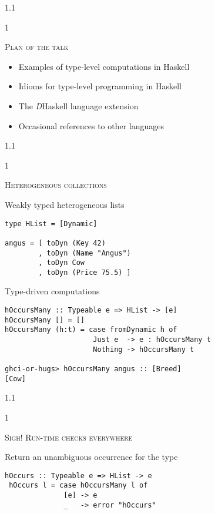 \documentclass{slides}
\newcommand{\header}[1]{{\large\scshape \color{Red} #1} \medskip }
\newcommand{\blau}[1]{{\color{Blue} #1} \medskip }
\newenvironment{myslide}{\begin{slide}\color{Blue}\begin{boxedminipage}{1.1\hsize}\begin{boxedminipage}{1\hsize}\color{Black}
\vspace{-170\in}
}{%
\smallskip
\end{boxedminipage}
\end{boxedminipage}
\end{slide}}
\begin{document}



\begin{myslide}

\header{Plan of the talk}

\begin{itemize}
\item Examples of type-level computations in Haskell
\item Idioms for type-level programming in Haskell
\item The \emph{D}Haskell language extension
\item Occasional references to other languages
\end{itemize}

\end{myslide}






\begin{myslide}

\header{Heterogeneous collections}

\blau{Weakly typed heterogeneous lists}

\begin{Verbatim}[fontseries=normal,fontsize=\tiny]
type HList = [Dynamic]

angus = [ toDyn (Key 42)
        , toDyn (Name "Angus")
        , toDyn Cow
        , toDyn (Price 75.5) ] 
\end{Verbatim}

\blau{Type-driven computations}

\begin{Verbatim}[fontseries=normal,fontsize=\tiny]
hOccursMany :: Typeable e => HList -> [e]
hOccursMany [] = []
hOccursMany (h:t) = case fromDynamic h of
                     Just e  -> e : hOccursMany t
                     Nothing -> hOccursMany t

ghci-or-hugs> hOccursMany angus :: [Breed]
[Cow]
\end{Verbatim}

\end{myslide}






\begin{myslide}

\header{Sigh! Run-time checks everywhere}

\blau{Return an unambiguous occurrence for the type}

\begin{Verbatim}[fontseries=normal,fontsize=\small]
 hOccurs :: Typeable e => HList -> e
 hOccurs l = case hOccursMany l of
              [e] -> e
              _   -> error "hOccurs"
\end{Verbatim}

\end{myslide}
\end{document}
